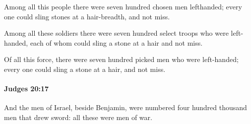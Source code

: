 			\begin{versebox}
					\item[BHS] 
					\item[ASV] Among all this people there were seven hundred chosen men lefthanded; every one could sling stones at a hair-breadth, and not miss.
					\item[NIV] Among all these soldiers there were seven hundred select troops who were left-handed, each of whom could sling a stone at a hair and not miss.
					\item[NRSV] Of all this force, there were seven hundred picked men who were left-handed; every one could sling a stone at a hair, and not miss.
			\end{versebox}

		\paragraph{Judges 20:17} %
			\label{JUDGES-20-17}

			And the men of Israel, beside Benjamin, were numbered four hundred thousand men that drew sword: all these were men of war.


